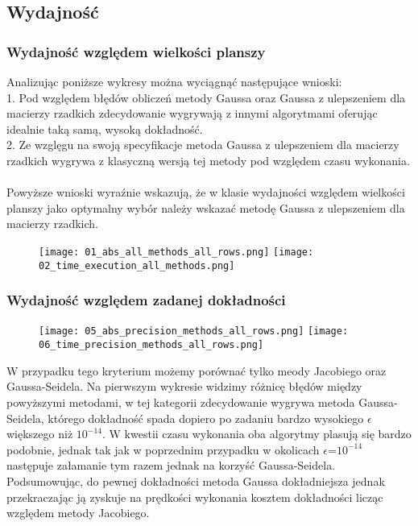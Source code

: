\subsection {Wydajność}
\subsubsection{Wydajność względem wielkości planszy}
Analizując poniższe wykresy można wyciągnąć następujące wnioski:\\
1. Pod względem błędów obliczeń metody Gaussa oraz Gaussa z ulepszeniem dla macierzy rzadkich zdecydowanie wygrywają z innymi algorytmami oferując idealnie taką samą, wysoką dokładność.\\
2. Ze wzglęgu na swoją specyfikacje metoda Gaussa z ulepszeniem dla macierzy rzadkich wygrywa z klasyczną wersją tej metody pod względem czasu wykonania.\\
\\
Powyższe wnioski wyraźnie wskazują, że w klasie wydajności względem wielkości planszy jako optymalny wybór należy wskazać metodę Gaussa z ulepszeniem dla macierzy rzadkich.
\begin{figure}[h]
\centering
\texttt{[image: 01\_abs\_all\_methods\_all\_rows.png]}
\texttt{[image: 02\_time\_execution\_all\_methods.png]}
\end{figure}
\newpage

\subsubsection{Wydajność względem zadanej dokładności}
\begin{figure}[h]
\centering
\texttt{[image: 05\_abs\_precision\_methods\_all\_rows.png]}
\texttt{[image: 06\_time\_precision\_methods\_all\_rows.png]}
\end{figure}
W przypadku tego kryterium możemy porównać tylko meody Jacobiego oraz Gaussa-Seidela. Na pierwszym wykresie widzimy różnicę błędów między powyższymi metodami, w tej kategorii zdecydowanie wygrywa metoda Gaussa-Seidela, którego dokładność spada dopiero po zadaniu bardzo wysokiego $\epsilon$ większego niż $10^{-14}$. W kwestii czasu wykonania oba algorytmy plasują się bardzo podobnie, jednak tak jak w poprzednim przypadku w okolicach $\epsilon$=$10^{-14}$ następuje załamanie tym razem jednak na korzyść Gaussa-Seidela.\\
Podsumowując, do pewnej dokładności metoda Gaussa dokładniejsza jednak przekraczając ją zyskuje na prędkości wykonania kosztem dokładności licząc względem metody Jacobiego.

